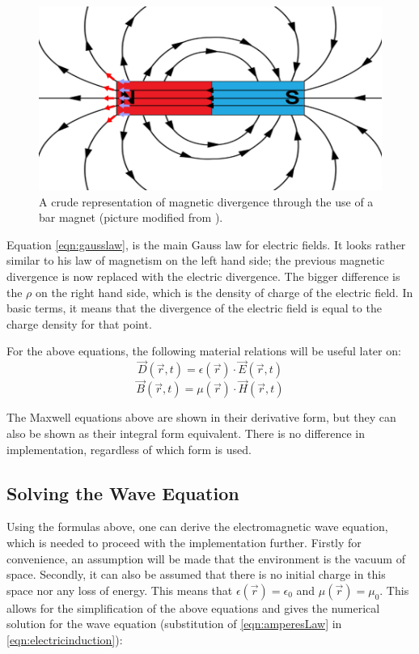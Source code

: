 \begin{figure}
	\centering
	\includegraphics[scale=0.9]{Figures/magneticdivergence}
	\decoRule
	\caption[Magnetic Divergence]{A crude representation of magnetic divergence through the use of a bar magnet (picture modified from \cite{magneticPic}).}
	\label{fig:magneticdivergence}
\end{figure}

Equation \ref{eqn:gausslaw}, is the main Gauss law for electric fields. It looks rather similar to his law of magnetism on the left hand side; the previous magnetic divergence is now replaced with the electric divergence. The bigger difference is the $\rho$ on the right hand side, which is the density of charge of the electric field. In basic terms, it means that the divergence of the electric field is equal to the charge density for that point.

For the above equations, the following material relations will be useful later on:
\begin{equation}
	 \vec{D}(\vec{r},t) = \epsilon(\vec{r}) \cdot \vec{E}(\vec{r},t)
\end{equation}
\begin{equation}
	\vec{B}(\vec{r},t) = \mu(\vec{r}) \cdot \vec{H}(\vec{r},t)
\end{equation}

The Maxwell equations above are shown in their derivative form, but they can also be shown as their integral form equivalent. There is no difference in implementation, regardless of which form is used.


\subsection{Solving the Wave Equation}
Using the formulas above, one can derive the electromagnetic wave equation, which is needed to proceed with the implementation further. Firstly for convenience, an assumption will be made that the environment is the vacuum of space. Secondly, it can also be assumed that there is no initial charge in this space nor any loss of energy. This means that $\epsilon(\vec{r})=\epsilon_{0}$ and $\mu(\vec{r})=\mu_{0}$. This allows for the simplification of the above equations and gives the numerical solution for the wave equation (substitution of \ref{eqn:amperesLaw} in \ref{eqn:electricinduction}):

